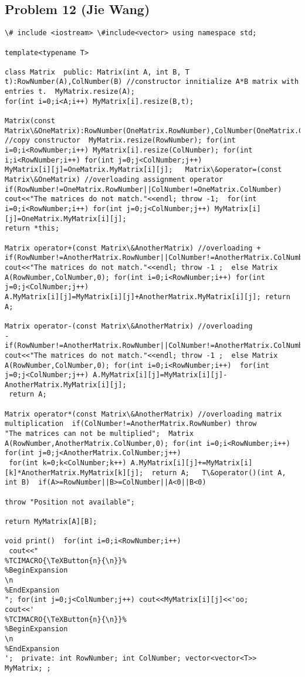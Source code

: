 \documentclass[10pt]{article}
\begin{document}
\subsection*{Problem 12 (Jie Wang)}
\begin{lstlisting}\# include <iostream> \#include<vector> using namespace std;

template<typename T>

class Matrix  public: Matrix(int A, int B, T t):RowNumber(A),ColNumber(B) //constructor innitialize A*B matrix with entries t.  MyMatrix.resize(A);
for(int i=0;i<A;i++) MyMatrix[i].resize(B,t);

Matrix(const Matrix\&OneMatrix):RowNumber(OneMatrix.RowNumber),ColNumber(OneMatrix.ColNumber)
//copy constructor  MyMatrix.resize(RowNumber); for(int i=0;i<RowNumber;i++) MyMatrix[i].resize(ColNumber); for(int i;i<RowNumber;i++) for(int j=0;j<ColNumber;j++)
MyMatrix[i][j]=OneMatrix.MyMatrix[i][j];   Matrix\&operator=(const Matrix\&OneMatrix) //overloading assignment operator  if(RowNumber!=OneMatrix.RowNumber||ColNumber!=OneMatrix.ColNumber)
cout<<"The matrices do not match."<<endl; throw -1;  for(int i=0;i<RowNumber;i++) for(int j=0;j<ColNumber;j++) MyMatrix[i][j]=OneMatrix.MyMatrix[i][j];
return *this;

Matrix operator+(const Matrix\&AnotherMatrix) //overloading +  if(RowNumber!=AnotherMatrix.RowNumber||ColNumber!=AnotherMatrix.ColNumber)
cout<<"The matrices do not match."<<endl; throw -1 ;  else Matrix A(RowNumber,ColNumber,0); for(int i=0;i<RowNumber;i++) for(int j=0;j<ColNumber;j++)
A.MyMatrix[i][j]=MyMatrix[i][j]+AnotherMatrix.MyMatrix[i][j]; return A;

Matrix operator-(const Matrix\&AnotherMatrix) //overloading
-  if(RowNumber!=AnotherMatrix.RowNumber||ColNumber!=AnotherMatrix.ColNumber) cout<<"The matrices do not match."<<endl; throw -1 ;  else Matrix
A(RowNumber,ColNumber,0); for(int i=0;i<RowNumber;i++)  for(int j=0;j<ColNumber;j++) A.MyMatrix[i][j]=MyMatrix[i][j]-AnotherMatrix.MyMatrix[i][j];
 return A;

Matrix operator*(const Matrix\&AnotherMatrix) //overloading matrix multiplication  if(ColNumber!=AnotherMatrix.RowNumber) throw
"The matrices can not be multiplied";  Matrix A(RowNumber,AnotherMatrix.ColNumber,0); for(int i=0;i<RowNumber;i++) for(int j=0;j<AnotherMatrix.ColNumber;j++)
 for(int k=0;k<ColNumber;k++) A.MyMatrix[i][j]+=MyMatrix[i][k]*AnotherMatrix.MyMatrix[k][j];  return A;   T\&operator()(int A, int B)  if(A>=RowNumber||B>=ColNumber||A<0||B<0)

throw "Position not available";

return MyMatrix[A][B];

void print()  for(int i=0;i<RowNumber;i++)
 cout<<"
%TCIMACRO{\TeXButton{n}{\n}}%
%BeginExpansion
\n
%EndExpansion
"; for(int j=0;j<ColNumber;j++) cout<<MyMatrix[i][j]<<'oo;
cout<<'
%TCIMACRO{\TeXButton{n}{\n}}%
%BeginExpansion
\n
%EndExpansion
';  private: int RowNumber; int ColNumber; vector<vector<T>>
MyMatrix; ; \end{lstlisting}
\end{document}
